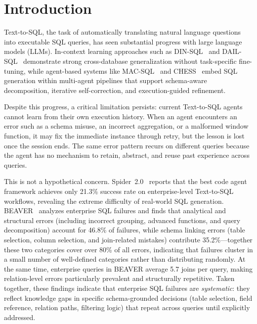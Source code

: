 
\section{Introduction}
\label{sec:introduction}

Text-to-SQL, the task of automatically translating natural language questions into executable SQL queries, has seen substantial progress with large language models (LLMs). 
In-context learning approaches such as DIN-SQL~\cite{pourreza2023din} and DAIL-SQL~\cite{gao2024dail} demonstrate strong cross-database generalization without task-specific fine-tuning, while agent-based systems like MAC-SQL~\cite{wang2025macsql} and CHESS~\cite{talaei2024chess} embed SQL generation within multi-agent pipelines that support schema-aware decomposition, iterative self-correction, and execution-guided refinement.



Despite this progress, a critical limitation persists: current Text-to-SQL agents cannot learn from their own execution history. 
When an agent encounters an error such as a schema misuse, an incorrect aggregation, or a malformed window function, it may fix the immediate instance through retry, but the lesson is lost once the session ends. 
The same error pattern recurs on different queries because the agent has no mechanism to retain, abstract, and reuse past experience across queries.


This is not a hypothetical concern. Spider~2.0~\cite{lei2024spider2} reports that the best code agent framework achieves only 21.3\% success rate on enterprise-level Text-to-SQL workflows, revealing the extreme difficulty of real-world SQL generation. BEAVER~\cite{chen2024beaver} analyzes enterprise SQL failures and finds that analytical and structural errors (including incorrect grouping, advanced functions, and query decomposition) account for 46.8\% of failures, while schema linking errors (table selection, column selection, and join-related mistakes) contribute 35.2\%---together these two categories cover over 80\% of all errors, indicating that failures cluster in a small number of well-defined categories rather than distributing randomly.
At the same time, enterprise queries in BEAVER average 5.7 joins per query, making relation-level errors particularly prevalent and structurally repetitive. 
Taken together, these findings indicate that enterprise SQL failures are \emph{systematic}: they reflect knowledge gaps in specific schema-grounded decisions (table selection, field reference, relation paths, filtering logic) that repeat across queries until explicitly addressed.

